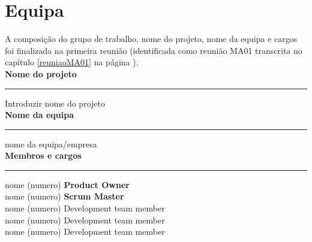 \section{Equipa}

A composição do grupo de trabalho, nome do projeto, nome da equipa e cargos foi finalizada na primeira reunião (identificada como reunião MA01 transcrita no capítulo \ref{reuniaoMA01} na página \pageref{reuniaoMA01}).\\[4mm]

\noindent \textbf{Nome do projeto}\\
\noindent \rule{\linewidth}{0.4pt}
\noindent Introduzir nome do projeto \\

\noindent \textbf{Nome da equipa}\\
\noindent \rule{\linewidth}{0.4pt}
\noindent nome da equipa/empresa \\

\noindent \textbf{Membros e cargos}\\
\noindent \rule{\linewidth}{0.4pt}
\noindent nome (numero) \textbf{Product Owner}\\
\noindent nome (numero) \textbf{Scrum Master}\\
\noindent nome (numero) Development team member\\
\noindent nome (numero) Development team member\\
\noindent nome (numero) Development team member\\
